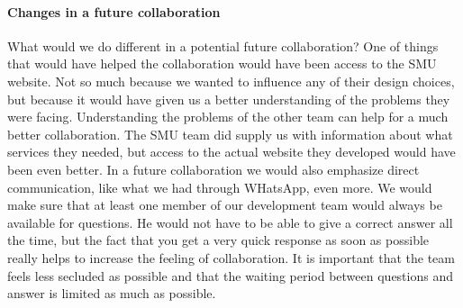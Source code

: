 \documentclass[a4paper,11pt,report]{article}
\begin{document}
\paragraph{Changes in a future collaboration}
What would we do different in a potential future collaboration? One of things that would have helped the collaboration would have been access to the SMU website. Not so much because we wanted to influence any of their design choices, but because it would have given us a better understanding of the problems they were facing. Understanding the problems of the other team can help for a much better collaboration. The SMU team did supply us with information about what services they needed, but access to the actual website they developed would have been even better. In a future collaboration we would also emphasize direct communication, like what we had through WHatsApp, even more. We would make sure that at least one member of our development team would always be available for questions. He would not have to be able to give a correct answer all the time, but the fact that you get a very quick response as soon as possible really helps to increase the feeling of collaboration. It is important that the team feels less secluded as possible and that the waiting period between questions and answer is limited as much as possible. 
\end{document}
